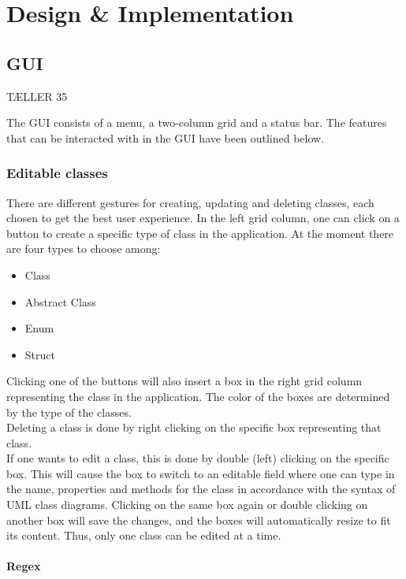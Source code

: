 \chapter{Design \& Implementation}
\label{sec:design_and_implementation}

\section{GUI}
\label{sec:gui}
TÆLLER 35

The GUI consists of a menu, a two-column grid and a status bar. The features that can be interacted with in the GUI have been outlined below.

\subsection{Editable classes}

There are different gestures for creating, updating and deleting classes, each chosen to get the best user experience. In the left grid column, one can click on a button to create a specific type of class in the application. At the moment there are four types to choose among:

\begin{itemize}
  \item Class
  \item Abstract Class
  \item Enum
  \item Struct
\end{itemize}

Clicking one of the buttons will also insert a box in the right grid column representing the class in the application. The color of the boxes are determined by the type of the classes.\\

Deleting a class is done by right clicking on the specific box representing that class.\\

If one wants to edit a class, this is done by double (left) clicking on the specific box. This will cause the box to switch to an editable field where one can type in the name, properties and methods for the class in accordance with the syntax of UML class diagrams. Clicking on the same box again or double clicking on another box will save the changes, and the boxes will automatically resize to fit its content. Thus, only one class can be edited at a time.

\subsubsection{Regex}

